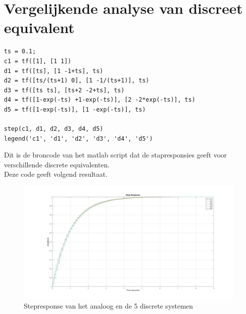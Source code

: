 \documentclass[a4paper, 12pt]{article}
\begin{document}
\section{Vergelijkende analyse van discreet equivalent}

\begin{lstlisting}
ts = 0.1;
c1 = tf([1], [1 1])
d1 = tf([ts], [1 -1+ts], ts)
d2 = tf([ts/(ts+1) 0], [1 -1/(ts+1)], ts)
d3 = tf([ts ts], [ts+2 -2+ts], ts)
d4 = tf([1-exp(-ts) +1-exp(-ts)], [2 -2*exp(-ts)], ts)
d5 = tf([1-exp(-ts)], [1 -exp(-ts)], ts)

step(c1, d1, d2, d3, d4, d5)
legend('c1', 'd1', 'd2', 'd3', 'd4', 'd5')
\end{lstlisting}

Dit is de broncode van het matlab script dat de stapresponsies geeft voor verschillende discrete equivalenten.\\
Deze code geeft volgend resultaat.

\begin{figure}[!h]
	\includegraphics[width=1\linewidth]{Labo3_step_response.jpg}
	\caption{Stepresponse van het analoog en de 5 discrete systemen}
	\label{fig:Labo3_step_response}
\end{figure}
\end{document}
